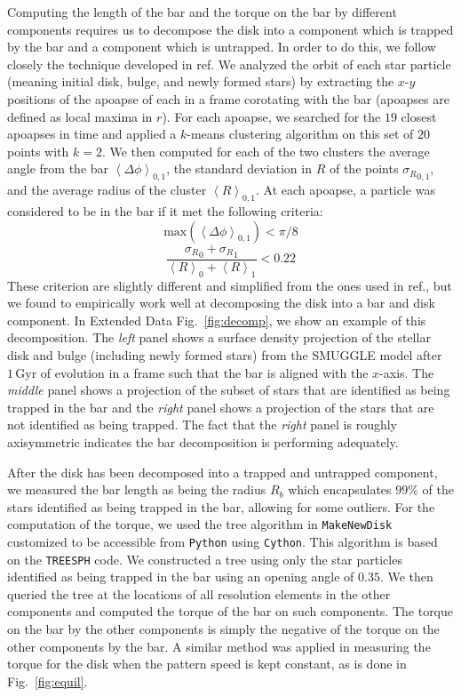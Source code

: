 \documentclass{natureprintstyle}
\begin{document}
Computing the length of the bar and the torque on the bar by different
components requires us to decompose the disk into a component which is trapped
by the bar and a component which is untrapped. In order to do this, we follow
closely the technique developed in ref.\cite{2016MNRAS.463.1952P} We analyzed
the orbit of each star particle (meaning initial disk, bulge, and newly formed
stars) by extracting the $x$-$y$ positions of the apoapse of each in a frame
corotating with the bar (apoapses are defined as local maxima in $r$). For
each apoapse, we searched for the $19$ closest apoapses in time and applied a
$k$-means clustering algorithm on this set of $20$ points with $k=2$. We then
computed for each of the two clusters the average angle from the bar
$\left<\Delta \phi\right>_{0,1}$, the standard deviation in $R$ of the points
${\sigma_R}_{0,1}$, and the average radius of the cluster
$\left<R\right>_{0,1}$. At each apoapse, a particle was considered to be in
the bar if it met the following criteria:
\begin{equation}
\textrm{max}\left(\left<\Delta \phi\right>_{0,1}\right) < \pi / 8
\end{equation}
\begin{equation}
\frac{{\sigma_R}_0 + {\sigma_R}_1}{\left<R\right>_0 + \left<R\right>_1} < 0.22
\end{equation}
These criterion are slightly different and simplified from the ones used in
ref.\cite{2016MNRAS.463.1952P}, but we found to empirically work well at
decomposing the disk into a bar and disk component. In Extended Data
Fig.~\ref{fig:decomp}, we show an example of this decomposition. The
\textit{left} panel shows a surface density projection of the stellar disk and
bulge (including newly formed stars) from the SMUGGLE model after
$1\,\text{Gyr}$ of evolution in a frame such that the bar is aligned with the
$x$-axis. The \textit{middle} panel shows a projection of the subset of stars
that are identified as being trapped in the bar and the \textit{right} panel
shows a projection of the stars that are not identified as being trapped. The
fact that the \textit{right} panel is roughly axisymmetric indicates the bar
decomposition is performing adequately.

After the disk has been decomposed into a trapped and untrapped component, we
measured the bar length as being the radius $R_b$ which encapsulates $99\%$ of
the stars identified as being trapped in the bar, allowing for some outliers.
For the computation of the torque, we used the tree algorithm in
\texttt{MakeNewDisk}\cite{2005MNRAS.361..776S} customized to be accessible
from \texttt{Python} using \texttt{Cython}. This algorithm is based on the
\texttt{TREESPH} code.\cite{1989ApJS...70..419H} We constructed a tree using
only the star particles identified as being trapped in the bar using an
opening angle of $0.35$. We then queried the tree at the locations of all
resolution elements in the other components and computed the torque of the bar
on such components. The torque on the bar by the other components is simply
the negative of the torque on the other components by the bar. A similar
method was applied in measuring the torque for the disk when the pattern speed
is kept constant, as is done in Fig.~\ref{fig:equil}.

% 
\end{document}
